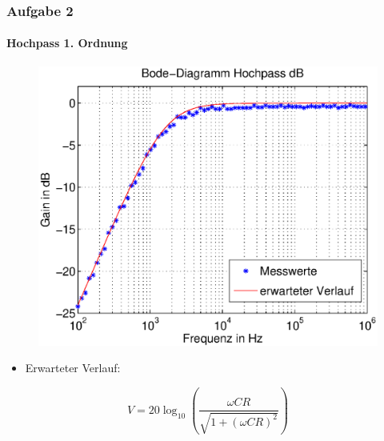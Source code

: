 \begin{frame}
    \frametitle{Aufgabe 2}
    \framesubtitle{Hochpass 1. Ordnung}
     \begin{figure}[H]
     \begin{center}
             \includegraphics[scale=0.45]{./img/2b_bode_hoch_dB.eps}
     \end{center}
     \end{figure}
     \begin{itemize}
         \item Erwarteter Verlauf: 
     \end{itemize}
     \begin{equation*}
            V = 20 \log_{10} \left( \frac{\omega C R}{\sqrt{1 + (\omega C
            R)^2}}\right)
     \end{equation*}
\end{frame}
